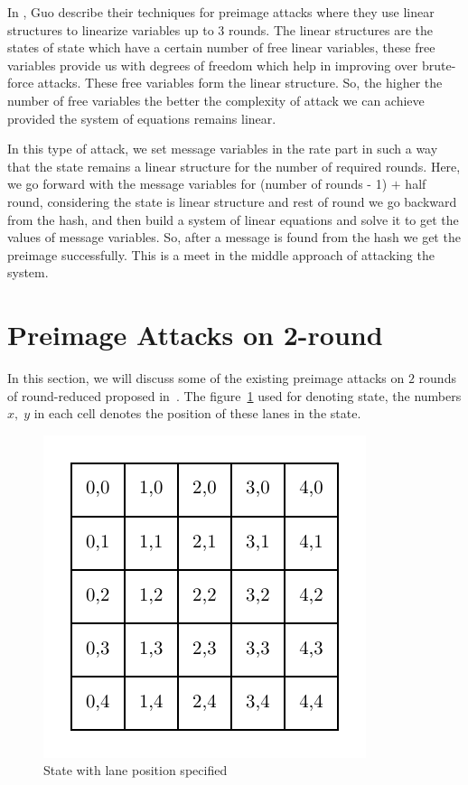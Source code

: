 In \cite{guo2016linear}, Guo \etal describe their techniques for preimage attacks where they use linear structures to linearize variables up to $3$ rounds. The linear structures are the states of \KECCAK{} state which have a certain number of free linear variables, these free variables provide us with degrees of freedom which help in improving over brute-force attacks. These free variables form the linear structure. So, the higher the number of free variables the better the complexity of attack we can achieve provided the system of equations remains linear.

In this type of attack, we set message variables in the rate part in such a way that the state remains a linear structure for the number of required rounds. Here, we go forward with the message variables for (number of rounds - 1) $+$ half round, considering the state is linear structure and rest of round we go backward from the hash, and then build a system of linear equations and solve it to get the values of message variables. So, after a message is found from the hash we get the preimage successfully. This is a meet in the middle approach of attacking the system.

\section{Preimage Attacks on 2-round \KECCAK}

In this section, we will discuss some of the existing preimage attacks on $2$ rounds of round-reduced \KECCAK{} proposed in~\cite{guo2016linear}. 
The figure~\ref{fig:linkeccakstate} used for denoting \KECCAK{} state, the numbers $x,\;y$ in each cell denotes the position of these lanes in the state.

\begin{figure}
    \centering
    \includegraphics{keccakState.pdf}
    \caption{\KECCAK{} State with lane position specified}
    \label{fig:linkeccakstate}
\end{figure}


